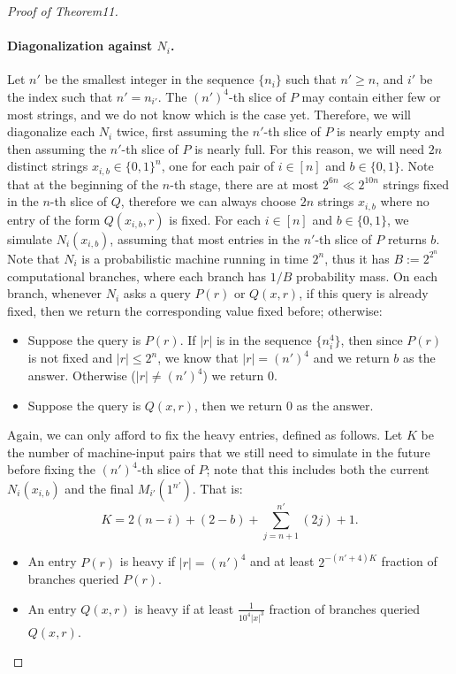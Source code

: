 \documentclass[10pt,a4paper]{article}
\begin{document}
\begin{proof}[Proof of Theorem11]
\paragraph{Diagonalization against $N_i$.}
Let $n'$ be the smallest integer in the sequence $\{n_i\}$ such that $n'\geq n$, and $i'$ be the index such that $n'=n_{i'}$. The $(n')^4$-th slice of $P$ may contain either few or most strings, and we do not know which is the case yet. Therefore, we will diagonalize each $N_i$ twice, first assuming the $n'$-th slice of $P$ is nearly empty and then assuming the $n'$-th slice of $P$ is nearly full. For this reason, we will need $2n$ distinct strings $x_{i,b}\in\{0,1\}^n$, one for each pair of $i\in[n]$ and $b\in\{0,1\}$. Note that at the beginning of the $n$-th stage, there are at most $2^{6n}\ll2^{10n}$ strings fixed in the $n$-th slice of $Q$, therefore we can always choose $2n$ strings $x_{i,b}$ where no entry of the form $Q(x_{i,b},r)$ is fixed.
For each $i\in[n]$ and $b\in\{0,1\}$, we simulate $N_i(x_{i,b})$, assuming that most entries in the $n'$-th slice of $P$ returns $b$. Note that $N_i$ is a probabilistic machine running in time $2^n$, thus it has $B:=2^{2^n}$ computational branches, where each branch has $1/B$ probability mass. On each branch, whenever $N_i$ asks a query $P(r)$ or $Q(x,r)$, if this query is already fixed, then we return the corresponding value fixed before; otherwise:
\begin{itemize}
\item Suppose the query is $P(r)$. If $|r|$ is in the sequence $\{n_i^4\}$, then since $P(r)$ is not fixed and $|r|\leq2^n$, we know that $|r|=(n')^4$ and we return $b$ as the answer. Otherwise ($|r|\neq(n')^4$) we return $0$.
\item Suppose the query is $Q(x,r)$, then we return $0$ as the answer.
\end{itemize}
Again, we can only afford to fix the heavy entries, defined as follows. Let $K$ be the number of machine-input pairs that we still need to simulate in the future before fixing the $(n')^4$-th slice of $P$; note that this includes both the current $N_i(x_{i,b})$ and the final $M_{i'}(1^{n'})$. That is:
\[K=2(n-i)+(2-b)+\sum_{j=n+1}^{n'}(2j)+1.\]
\begin{itemize}
\item An entry $P(r)$ is heavy if $|r|=(n')^4$ and at least $2^{-(n'+4)K}$ fraction of branches queried $P(r)$.
\item An entry $Q(x,r)$ is heavy if at least $\frac{1}{10^4|x|^3}$ fraction of branches queried $Q(x,r)$.

\end{itemize}
\end{proof}
\end{document}
